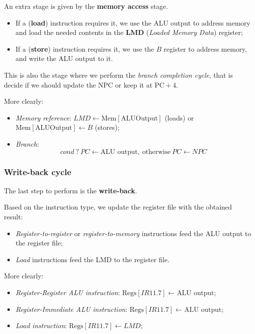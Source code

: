 \documentclass[a4paper,11pt]{article}
\begin{document}
An extra stage is given by the \textbf{memory access} stage.

\begin{itemize}
	\item If a (\textbf{load}) instruction requires it, we use the ALU output to address memory and load the needed contents in the \textbf{LMD} (\textit{Loaded Memory Data}) register;
	\item If a (\textbf{store}) instruction requires it, we use the $B$ register to address memory, and write the ALU output to it.
\end{itemize}

This is also the stage where we perform the \textit{branch completion cycle}, that is decide if we should update the NPC or keep it at $\text{PC} + 4$.

More clearly:
\begin{itemize}
	\item \textit{Memory reference}: $LMD \leftarrow \text{Mem}[\text{ALUOutput}]$ (loads) or $\text{Mem}[\text{ALUOutput}] \leftarrow B$ (stores);
	\item \textit{Branch}:
	      $$
		      cond \ ?\  PC \leftarrow \text{ALU output}, \ \text{otherwise} \ PC \leftarrow NPC
	      $$
\end{itemize}

\subsubsection{Write-back cycle}

The last step to perform is the \textbf{write-back}.

Based on the instruction type, we update the register file with the obtained result:
\begin{itemize}
	\item \textit{Register-to-register} or \textit{register-to-memory} instructions feed the ALU output to the register file;
	\item \textit{Load} instructions feed the LMD to the register file.
\end{itemize}

More clearly:
\begin{itemize}
	\item \textit{Register-Register ALU instruction}: $\text{Regs}[IR11.7] \leftarrow \text{ALU output}$;
	\item \textit{Register-Immediate ALU instruction}: $\text{Regs}[IR11.7] \leftarrow \text{ALU output}$;
	\item \textit{Load instruction}: $\text{Regs}[IR11.7] \leftarrow LMD$;
\end{itemize}
\end{document}

